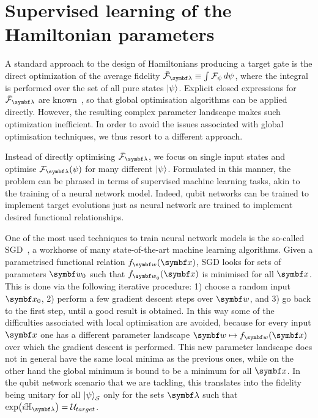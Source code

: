 \section{Supervised learning of the Hamiltonian parameters}
\label{learning}

A standard approach to the design of Hamiltonians producing a target gate is the direct optimization of the average fidelity $\barF_\bslambda\equiv \int \calF_\psi \,d\psi$,
where the integral is performed over the set of all pure states $\ket\psi$.
Explicit closed expressions for $\barF_\bslambda$ are known~\cite{banchi2011nonperturbative,magesan2011gate,pedersen2007fidelity}, so that global optimisation algorithms can be applied directly.
However, the resulting complex parameter landscape makes such optimization inefficient. In order to avoid  the issues associated with global optimisation techniques, we thus resort to a different approach.

Instead of directly optimising $\barF_\bslambda$, we focus on single input states and optimise $\calF_\bslambda(\psi)$ for many different $\ket\psi$.
Formulated in this manner, the problem can be phrased in terms of supervised machine learning tasks, akin to the training of a neural network model.
Indeed, qubit networks can be trained to implement target evolutions just as neural network are trained to implement desired functional relationships.

One of the most used techniques to train neural network models is the so-called \ac{SGD}~\cite{wengert1964a,ruder2016an},
a workhorse of many state-of-the-art machine learning algorithms.
Given a parametrised functional relation $f_\bsw(\bsx)$, \ac{SGD} looks for sets of parameters $\bs w_0$ such that $f_{\bsw_0}(\bsx)$ is minimised for all $\bsx$.
This is done via the following iterative procedure: 1) choose a random input $\bsx_0$, 2) perform a few gradient descent steps over $\bsw$, and 3) go back to the first step, until a good result is obtained.
In this way some of the difficulties associated with local optimisation are avoided, because for every input $\bsx$ one has a different parameter landscape $\bsw\mapsto f_\bsw(\bsx)$ over which the gradient descent is performed.
This new parameter landscape does not in general have the same local minima as the previous ones, while on the other hand the global minimum is bound to be a minimum for all $\bsx$.
In the qubit network scenario that we are tackling, this translates into the fidelity being unitary for all $\ket\psi_{\cal S}$ only for the sets $\bslambda$ such that $\exp(i\HH_\bslambda)=\Utarget$.

